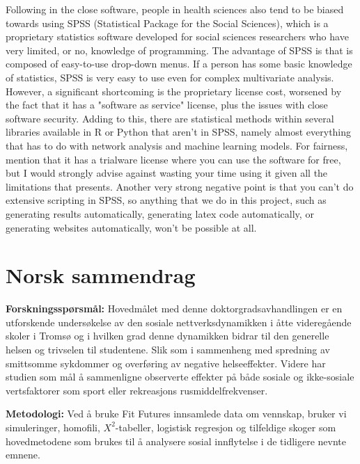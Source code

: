Following in the close software, people in health sciences also tend to be biased towards using SPSS (Statistical Package for the Social Sciences), which is a proprietary statistics software developed for social sciences researchers who have very limited, or no, knowledge of programming. The advantage of SPSS is that is composed of easy-to-use drop-down menus. If a person has some basic knowledge of statistics, SPSS is very easy to use even for complex multivariate analysis. However, a significant shortcoming is the proprietary license cost, worsened by the fact that it has a "software as service" license, plus the issues with close software security. Adding to this, there are statistical methods within several libraries available in R or Python that aren't in SPSS, namely almost everything that has to do with network analysis and machine learning models. For fairness, mention that it has a trialware license where you can use the software for free, but I would strongly advise against wasting your time using it given all the limitations that presents. Another very strong negative point is that you can't do extensive scripting in SPSS, so anything that we do in this project, such as generating results automatically, generating latex code automatically, or generating websites automatically, won't be possible at all.


\chapter*{Norsk sammendrag}

\textbf{Forskningsspørsmål:} Hovedmålet med denne doktorgradsavhandlingen er en utforskende undersøkelse av den sosiale nettverksdynamikken i åtte videregående skoler i Tromsø og i hvilken grad denne dynamikken bidrar til den generelle helsen og trivselen til studentene. Slik som i sammenheng med spredning av smittsomme sykdommer og overføring av negative helseeffekter. Videre har studien som mål å sammenligne observerte effekter på både sosiale og ikke-sosiale vertsfaktorer som sport eller rekreasjons rusmiddelfrekvenser.

\vspace{0.90\baselineskip}

\textbf{Metodologi:} Ved å bruke Fit Futures innsamlede data om vennskap, bruker vi simuleringer, homofili, $X^2$-tabeller, logistisk regresjon og tilfeldige skoger som hovedmetodene som brukes til å analysere sosial innflytelse i de tidligere nevnte emnene.

